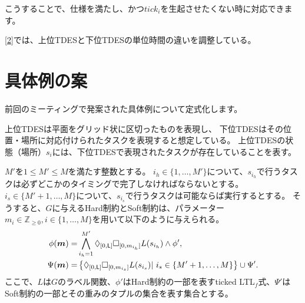 \documentclass[ 10pt]{jsarticle}
\newcommand{\Len}{{\sf L}}
\begin{document}
%
%
\begin{comment}
%
%
更新されたDES $G_{i,act}'$から得られるTDESに与える仕様$\phi_i$に以下の仕様を追加する。
\begin{align}\label{add_spec}
&(\lnot \textit{Fin})U_{[0,\Len_i]}\phi_i,&\Diamond_{[0,\Len_i]}\textit{Fin}.
\end{align}
一つ目の仕様は、もともと与えていた仕様$\phi_i$を満たすまで$s'$に遷移してはいけないことを表す。

したがって、最終的に$i$番目の下位TDESに与える仕様$\phi_i'$は、
\begin{align}
\phi_i'=\phi_i 
\land\left\{(\lnot \textit{Fin})U_{[0,\Len_i]}\phi_i \right\}
\land \Diamond_{[0,\Len_i]}\textit{Fin}
\end{align}
となる。
%
%
\end{comment}
%
こうすることで、仕様を満たし、かつ$\textit{tick}_i$を生起させたくない時に対応できます。
%

\ref{2}では、上位TDESと下位TDESの単位時間の違いを調整している。
%
\section{具体例の案}
前回のミーティングで発案された具体例について定式化します。

上位TDESは平面をグリッド状に区切ったものを表現し、
下位TDESはその位置・場所に対応付けられたタスクを表現すると想定している。
上位TDESの状態（場所）$s_i$には、下位TDESで表現されたタスクが存在していることを表す。

$M'$を$1\leq M'\leq M$を満たす整数とする。
$i_h\in\{1,\ldots, M'\}$について、$s_{i_h}$で行うタスクは必ずどこかのタイミングで完了しなければならないとする。
$i_s\in\{M'+1,\ldots, M\}$について、$s_{i_s}$で行うタスクは可能ならば実行するとする。
そうすると、$G$に与えるHard制約とSoft制約は、パラメーター$m_i\in \mathbb{Z}_{\geq 0},i\in\{1,\ldots,M\}$を用いて以下のように与えられる。
\begin{align}
\phi(\bm{m})=&\bigwedge_{i_h=1}^{M'}\Diamond_{[0,\Len]}\Box_{[0,m_{i_h}]}L(s_{i_h}) \land \phi',\\
\Psi(\bm{m})=&\left\{\Diamond_{[0,\Len]}\Box_{[0,m_{i_s}]}L(s_{i_s})|\ i_s\in\left\{M'+1,\ldots, M\right\}\right\}\cup \Psi'.
\end{align}
ここで、$L$は$G$のラベル関数、$\phi'$はHard制約の一部を表すticked LTL${}_f$式、$\Psi'$はSoft制約の一部とその重みのタプルの集合を表す集合とする。




% 
\end{document}
